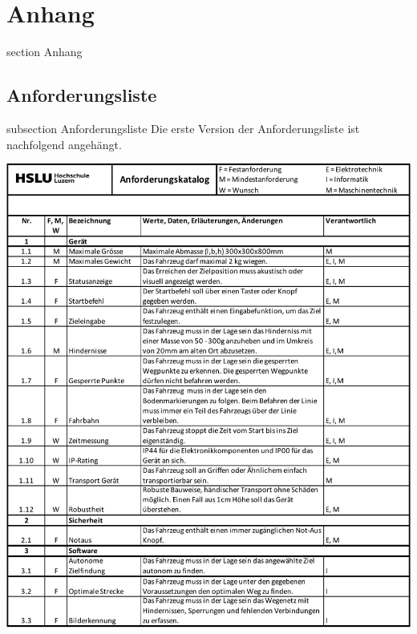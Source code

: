 \newpage

\section*{Anhang}
    {section}
    {Anhang}
    
\subsection*{Anforderungsliste}\label{anforderungliste}
    {subsection}
    {Anforderungsliste}
Die erste Version der Anforderungsliste ist nachfolgend angehängt.

\begin{table}[H]
\centering
\includegraphics[width=\textwidth]{assets/Anforderungsliste_V1.01_page1.pdf}
\caption{Anforderungsliste Teil 1}
\label{table:anforderungsliste_page1}
\end{table}
\newpage

